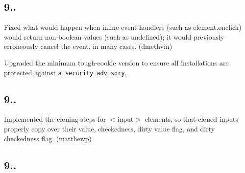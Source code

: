 \subsection*{9..}


\begin{DoxyItemize}
\item Fixed what would happen when inline event handlers (such as {\ttfamily element.\+onclick}) would return non-\/boolean values (such as {\ttfamily undefined}); it would previously erroneously cancel the event, in many cases. (dmethvin)
\item Upgraded the minimum tough-\/cookie version to ensure all installations are protected against \href{https://nodesecurity.io/advisories/130}{\tt a security advisory}.
\end{DoxyItemize}

\subsection*{9..}


\begin{DoxyItemize}
\item Implemented the cloning steps for {\ttfamily $<$input$>$} elements, so that cloned inputs properly copy over their value, checkedness, dirty value flag, and dirty checkedness flag. (matthewp)
\end{DoxyItemize}

\subsection*{9..}


